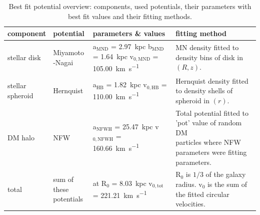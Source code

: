 \begin{table}[htbp]
\captionsetup{format=plain}
    \centering
    \begin{tabular}{@{}llll@{}}
         \toprule
         component& potential & parameters \& values &fitting method  \\
         \midrule
         stellar disk& \makecell[tl]{Miyamoto\\-Nagai}&\makecell[tl]{a$_{\mathrm{MND}}$ = \SI{2.97}{kpc}\\b$_{\mathrm{MND}}$ = \SI{1.64}{kpc}\\v$_{0,\mathrm{MND}}$ = \SI{105.00}{km.s^{-1}}} & \makecell[tl]{\ac{MN} density fitted \\to density bins \\of disk in $(R,z)$.}\vspace{3mm}\\
         \makecell[tl]{stellar\\ spheroid}& Hernquist&\makecell[tl]{a$_{\mathrm{HB}}$ = \SI{1.82}{kpc}\\v$_{0,\mathrm{HB}}$ = \SI{110.00}{km.s^{-1}}}& \makecell[tl]{Hernquist density fitted\\ to density shells of \\spheroid in $(r)$.}\vspace{3mm}\\
         \ac{DM} halo&\ac{NFW}&\makecell[tl]{a$_{\mathrm{NFWH}}$ = \SI{25.47}{kpc}\\v$_{0,\mathrm{NFWH}}$ = \SI{160.66}{km.s^{-1}}}&\makecell[tl]{Total potential fitted to \\'pot' value of random \ac{DM} \\particles where \ac{NFW}\\ parameters were fitting \\parameters.}\vspace{3mm}\\
         total & \makecell[tl]{sum of these\\ potentials} & \makecell[tl]{at R$_0$ = \SI{8.03}{kpc} \\ v$_{0,\mathrm{tot}}$ = \SI{221.21}{km.s^{-1}}}& \makecell[tl]{R$_0$ is $1/3$ of the galaxy \\radius. v$_0$ is the sum of \\the fitted circular velocities.}\vspace{3mm}\\
         \bottomrule 
    \end{tabular}
    \caption{Best fit potential overview: components, used potentials, their parameters with best fit values and their fitting methods.}
    \label{tab:pot_best_fit_params}
\end{table}


